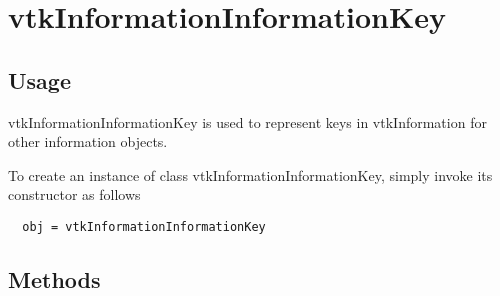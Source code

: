 \section{vtkInformationInformationKey}

\subsection{Usage}

 vtkInformationInformationKey is used to represent keys in vtkInformation
 for other information objects.

To create an instance of class vtkInformationInformationKey, simply
invoke its constructor as follows
\begin{verbatim}
  obj = vtkInformationInformationKey
\end{verbatim}
\subsection{Methods}

